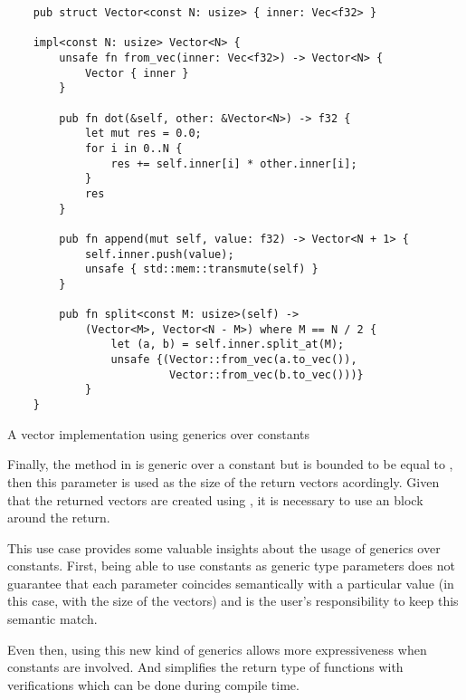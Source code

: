 \begin{listing}[H]
    \begin{verbatim}
    pub struct Vector<const N: usize> { inner: Vec<f32> }

    impl<const N: usize> Vector<N> {
        unsafe fn from_vec(inner: Vec<f32>) -> Vector<N> {
            Vector { inner }
        }

        pub fn dot(&self, other: &Vector<N>) -> f32 {
            let mut res = 0.0;
            for i in 0..N {
                res += self.inner[i] * other.inner[i];
            }
            res
        }

        pub fn append(mut self, value: f32) -> Vector<N + 1> {
            self.inner.push(value);
            unsafe { std::mem::transmute(self) }
        }

        pub fn split<const M: usize>(self) -> 
            (Vector<M>, Vector<N - M>) where M == N / 2 {
                let (a, b) = self.inner.split_at(M);
                unsafe {(Vector::from_vec(a.to_vec()), 
                         Vector::from_vec(b.to_vec()))}
            }
    }
    \end{verbatim}
    \caption{A vector implementation using generics over constants}
  \label{lst:vector_const_gen}
\end{listing}

Finally, the  method in  is generic
over a constant  but is bounded to be equal to , then
this parameter is used as the size of the return vectors acordingly. Given that
the returned vectors are created using , it is necessary to
use an  block around the return.

This use case provides some valuable insights about the usage of generics over
constants. First, being able to use constants as generic type parameters does
not guarantee that each parameter coincides semantically with a particular
value (in this case, with the size of the vectors) and is the user's
responsibility to keep this semantic match. 

Even then, using this new kind of generics allows more expressiveness when
constants are involved. And simplifies the return type of functions with
verifications which can be done during compile time.

